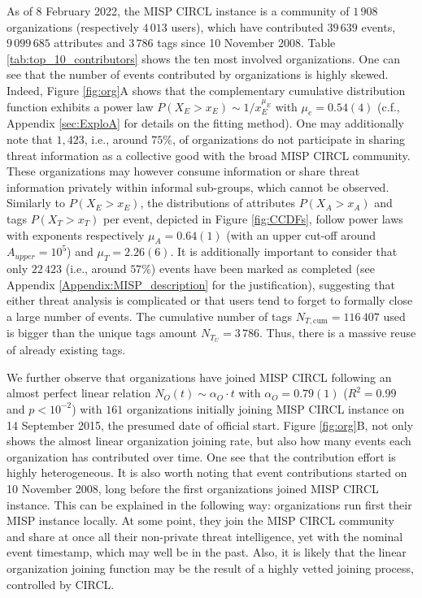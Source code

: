 \documentclass[unnumsec,webpdf,contemporary,large]{oup-authoring-template}%
\theoremstyle{thmstyleone}%
\theoremstyle{thmstyletwo}%
\theoremstyle{thmstylethree}%
\begin{document}
As of 8 February 2022, the MISP CIRCL instance is a community of $1\,908$ organizations (respectively $4\,013$ users), which have contributed $39\,639$ events, $9\,099\,685$ attributes and $3\,786$ tags since 10 November 2008. Table \ref{tab:top_10_contributors} shows the ten most involved organizations. One can see that the number of events contributed by organizations is highly skewed. Indeed, Figure \ref{fig:org}A shows that the complementary cumulative distribution function exhibits a power law $P(X_{E}>x_{E}) \sim 1/x_{E}^{\mu_{E}}$ with $\mu_{e} = 0.54(4)$ (c.f., Appendix \ref{sec:ExploA} for details on the fitting method). One may additionally note that $1,423$, i.e., around $75\%$, of organizations do not participate in sharing threat information as a collective good with the broad MISP CIRCL community. These organizations may however consume information or share threat information privately within informal sub-groups, which cannot be observed. Similarly to $P(X_E > x_{E})$, the distributions of attributes $P(X_{A} > x_{A})$ and tags $P(X_{T} > x_{T})$ per event, depicted in Figure \ref{fig:CCDFs}, follow power laws with exponents respectively $\mu_A = 0.64(1)$ (with an upper cut-off around $A_{upper} = 10^5$) and $\mu_{T} = 2.26(6)$. It is additionally important to consider that only $22\,423$ (i.e., around $57\%$) events have been marked as completed (see Appendix \ref{Appendix:MISP_description} for the justification), suggesting that either threat analysis is complicated or that users tend to forget to formally close a large number of events. The cumulative number of tags $N_{T,\textrm{cum}} = 116\,407$ used is bigger than the unique tags amount $N_{T_U} = 3\,786$. Thus, there is a massive reuse of already existing tags.
    
We further observe that organizations have joined MISP CIRCL following an almost perfect linear relation $N_O(t) \sim \alpha_O \cdot t $ with $\alpha_O = 0.79(1)$ ($R^2 = 0.99$ and $p<10^{-2}$) with $161$ organizations initially joining MISP CIRCL instance on 14 September 2015, the presumed date of official start. Figure \ref{fig:org}B, not only shows the almost linear organization joining rate, but also how many events each organization has contributed over time. One see that the contribution effort is highly heterogeneous. It is also worth noting that event contributions started on 10 November 2008, long before the first organizations joined MISP CIRCL instance. This can be explained in the following way: organizations run first their MISP instance locally. At some point, they join the MISP CIRCL community and share at once all their non-private threat intelligence, yet with the nominal event timestamp, which may well be in the past. Also, it is likely that the linear organization joining function may be the result of a highly vetted joining process, controlled by CIRCL.
\end{document}
